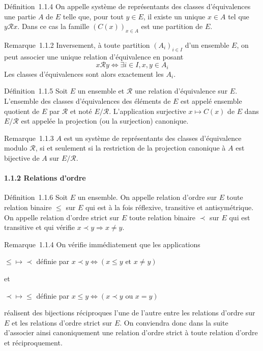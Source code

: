 Définition~1.1.4 On appelle système de représentants des classes
d'équivalences une partie $A$ de $E$ telle que, pour tout $y \in E$, il existe
un unique $x \in A$ tel que $y\mathcal{R}x$. Dans ce cas la famille
$\left(C(x)\right)_{x \in A}$ est une partition de $E$.

Remarque~1.1.2 Inversement, à toute partition $(A_i)_{i \in I}$ d'un ensemble $E$, on peut associer une unique
relation d'équivalence en posant
\[
x\mathcal{R}y \Leftrightarrow \exists i \in I, x,y \in A_i
\]
Les classes d'équivalences sont alors exactement les $A_i$.

Définition~1.1.5 Soit $E$ un ensemble et $\mathcal{R}$ une relation d'équivalence sur
$E$. L'ensemble des classes d'équivalences des éléments de $E$ est appelé
ensemble quotient de $E$ par $\mathcal{R}$ et noté $E/\mathcal{R}$. L'application surjective
$x \mapsto C(x)$ de $E$ dans $E/\mathcal{R}$ est appelée la
projection (ou la surjection) canonique.

Remarque~1.1.3 $A$ est un système de représentants des classes
d'équivalence modulo $\mathcal{R}$, si et seulement si la restriction de la
projection canonique à $A$ est bijective de $A$ sur $E/\mathcal{R}$.

\paragraph{1.1.2 Relations d'ordre}

Définition~1.1.6 Soit $E$ un ensemble. On appelle relation d'ordre sur $E$
toute relation binaire $\leqslant$ sur $E$ qui est à la fois réflexive, transitive
et antisymétrique. On appelle relation d'ordre strict sur $E$ toute
relation binaire $\prec$ sur $E$ qui est transitive et qui vérifie $x \prec y \Rightarrow x\neq y$.

Remarque~1.1.4 On vérifie immédiatement que les applications

$\leqslant \mapsto \prec$ définie par $x \prec y \Leftrightarrow (x \leqslant y \text{ et } x \neq y)$

et

$\prec \mapsto \leqslant$ définie par $x \leqslant y \Leftrightarrow (x \prec y \text{ ou } x = y)$

réalisent des bijections réciproques l'une de l'autre entre les
relations d'ordre sur $E$ et les relations d'ordre strict sur $E$. On
conviendra donc dans la suite d'associer ainsi canoniquement une
relation d'ordre strict à toute relation d'ordre et réciproquement.


